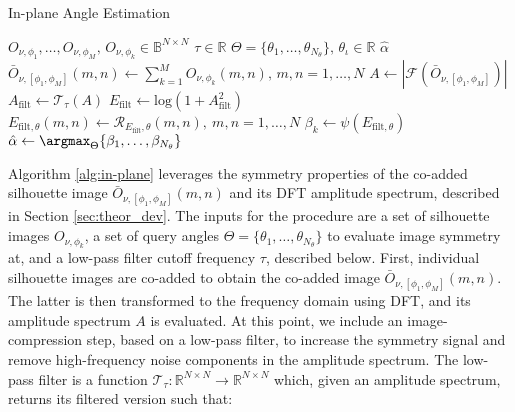 \begin{algorithm}
\caption{In-plane Angle Estimation}
\label{alg:in-plane}
\begin{algorithmic}[1]
\Require $O_{\nu,\phi_1}, \dots, O_{\nu,\phi_M},\, O_{\nu,\phi_k}\in\mathbb{B}^{N\times N}$ 
\Require $\tau\in\mathbb{R}$ 
\Require $\Theta=\{ \theta_1, \dots, \theta_{N_\theta} \},\, \theta_\iota\in\mathbb{R}$ 
\Ensure $\hat{\alpha}$ 
\State $\bar{O}_{\nu,[\phi_1,\phi_M]}(m,n) \gets \sum_{k=1}^M O_{\nu,\phi_k}(m,n),\, m,n = 1,\dots,N$ 
\State $A \gets |\mathcal{F}(\bar{O}_{\nu,[\phi_1,\phi_M]})|$ 
\State $A_\mathrm{filt} \gets \mathcal{T}_\tau(A)$ 
\State $E_\mathrm{filt} \gets \mathrm{log}(1 + A_\mathrm{filt}^2)$  \label{state:log}
    \State $E_{\mathrm{filt},\theta}(m,n) \gets \mathcal{R}_{E_\mathrm{filt},\theta}(m,n),\ m,n=1,\dots,N$ 
    \State $\beta_k \gets \psi(E_{\mathrm{filt},\theta})$ 
\EndFor
\State $\hat{\alpha} \gets \argmax_\Theta \{ \beta_1, \dots, \beta_{N_\theta} \}$

\end{algorithmic}
\end{algorithm}


Algorithm \ref{alg:in-plane} leverages the symmetry properties of the co-added silhouette image $\bar{O}_{\nu,[\phi_1,\phi_M]}(m,n)$ and its DFT amplitude spectrum, described in Section \ref{sec:theor_dev}. The inputs for the procedure are a set of silhouette images $O_{\nu,\phi_k}$, a set of query angles $\Theta = \{ \theta_1, \dots, \theta_{N_\theta} \}$ to evaluate image symmetry at, and a low-pass filter cutoff frequency $\tau$, described below. First, individual silhouette images are co-added to obtain the co-added image $\bar{O}_{\nu,[\phi_1,\phi_M]}(m,n)$. The latter is then transformed to the frequency domain using DFT, and its amplitude spectrum $A$ is evaluated. At this point, we include an image-compression step, based on a low-pass filter, to increase the symmetry signal and remove high-frequency noise components in the amplitude spectrum. The low-pass filter is a function $\mathcal{T}_\tau:\mathbb{R}^{N\times N} \rightarrow \mathbb{R}^{N\times N}$ which, given an amplitude spectrum, returns its filtered version such that:

